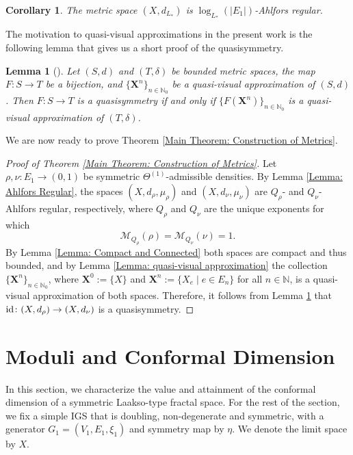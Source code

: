 \documentclass{amsart}
\newcommand{\id}{{\rm id}}
\newtheorem{lemma}[equation]{Lemma}
\newtheorem{corollary}[equation]{Corollary}
\numberwithin{equation}{section}
\theoremstyle{definition}
\theoremstyle{remark}
\newcommand{\N}{\mathbb{N}}
\newcommand{\cM}{\mathcal{M}}
\begin{document}
\begin{corollary}
    The metric space \((X,d_{L_*})\) is \(\log_{L_*}(\lvert E_1\rvert)\)-Ahlfors regular.
\end{corollary}

The motivation to quasi-visual approximations in the present work is the following lemma that gives us a short proof of the quasisymmetry.

\begin{lemma}[{\cite[Proposition 2.7]{bonkmeyer}}]\label{Lemma: quasi-visual quasisymmetry}
    Let \((S,d)\) and \((T,\delta)\) be bounded metric spaces, the map \(F\colon S\to T\) be a bijection, and \(\{\textbf{X}^n\}_{n\in\N_0}\) be a quasi-visual approximation of \((S,d)\). Then \(F\colon S\to T\) is a quasisymmetry if and only if \(\{F(\textbf{X}^n)\}_{n\in\N_0}\) is a quasi-visual approximation of \((T,\delta)\).
\end{lemma}

We are now ready to prove Theorem \ref{Main Theorem: Construction of Metrics}.

\begin{proof}[Proof of Theorem \ref{Main Theorem: Construction of Metrics}]
    Let \(\rho,\nu\colon E_1 \to (0,1)\) be symmetric \(\Theta^{(1)}\)-admissible densities. By Lemma \ref{Lemma: Ahlfors Regular}, the spaces \((X,d_\rho,\mu_\rho)\) and \((X,d_\nu,\mu_\nu)\) are \(Q_\rho\)- and \(Q_\nu\)-Ahlfors regular, respectively, where \(Q_\rho\) and \(Q_\nu\) are the unique exponents for which
        \[
            \cM_{Q_\rho}(\rho)=\cM_{Q_\nu}(\nu)=1.
        \]
    By Lemma \ref{Lemma: Compact and Connected} both spaces are compact and thus bounded, and by Lemma \ref{Lemma: quasi-visual approximation} the collection \(\{\mathbf{X}^n\}_{n\in\N_0}\), where \(\mathbf{X}^0:=\{X\}\) and \(\mathbf{X}^n:=\{X_e\mid e\in E_n\}\) for all \(n\in\N\), is a quasi-visual approximation of both spaces. Therefore, it follows from Lemma \ref{Lemma: quasi-visual quasisymmetry} that \(\id \colon(X,d_\rho)\to(X,d_\nu)\) is a quasisymmetry.


\end{proof}





\section{Moduli and Conformal Dimension}\label{Section: Moduli and Conformal Dimension}

In this section, we characterize the value and attainment of the conformal dimension of a symmetric Laakso-type fractal space. For the rest of the section, we fix a simple IGS that is doubling, non-degenerate and symmetric, with a generator \(G_1=(V_1,E_1,\xi_1)\) and symmetry map by \(\eta\). We denote the limit space by \(X\).
\end{document}
